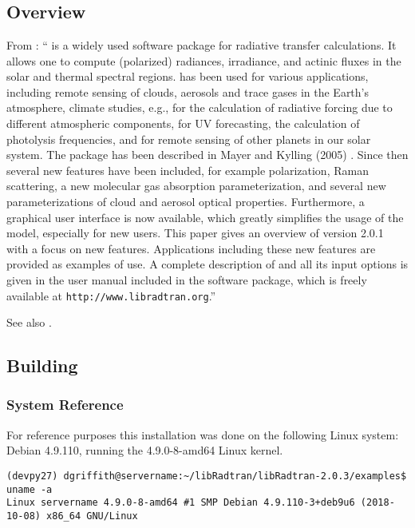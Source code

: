 

\chapter{\libradtran{}}
\label{chap:libRadtran}


\section{\libradtran{} Overview}

From \cite{EmdeLibRadtran2016}:
``\libradtran{} is a widely used software package for
radiative transfer calculations. It allows one to compute (polarized) radiances, irradiance, and actinic fluxes in the solar and thermal spectral regions. \libradtran{} has been used
for various applications, including remote sensing of clouds,
aerosols and trace gases in the Earth’s atmosphere, climate
studies, e.g., for the calculation of radiative forcing due to
different atmospheric components, for UV forecasting, the
calculation of photolysis frequencies, and for remote sensing
of other planets in our solar system. The package has been
described in Mayer and Kylling (2005) \cite{libRadtran2005}. Since then several
new features have been included, for example polarization,
Raman scattering, a new molecular gas absorption parameterization, and several new parameterizations of cloud and
aerosol optical properties. Furthermore, a graphical user interface is now available, which greatly simplifies the usage
of the model, especially for new users. This paper gives an
overview of \libradtran{} version 2.0.1 with a focus on new features. Applications including these new features are provided
as examples of use. A complete description of \libradtran{} and
all its input options is given in the user manual included in
the \libradtran{} software package, which is freely available at
\lstinline{http://www.libradtran.org}.''

See also 
\cite{libRadtran2005,libRadTranUserGuide2012,libRadtranDownload2020,libRadtranmuenchen2020}.


\section{Building \libradtran{}}

\subsection{System Reference}
For reference purposes this installation was done on the following Linux system: Debian 4.9.110, running the 4.9.0-8-amd64 Linux kernel.
\begin{lstlisting}[style=tinysize]
(devpy27) dgriffith@servername:~/libRadtran/libRadtran-2.0.3/examples$ uname -a
Linux servername 4.9.0-8-amd64 #1 SMP Debian 4.9.110-3+deb9u6 (2018-10-08) x86_64 GNU/Linux
\end{lstlisting}




